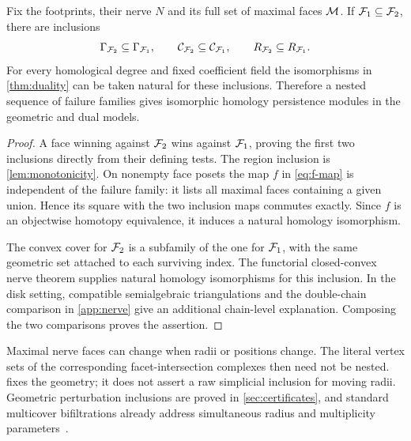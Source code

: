 \begin{theorem}\label{thm:natural}
Fix the footprints, their nerve $N$ and its full set of maximal faces $\mathcal M$. If $\mathcal F_1\subseteq\mathcal F_2$, there are inclusions
\[
\Gamma_{\mathcal F_2}\subseteq\Gamma_{\mathcal F_1},\qquad
\mathcal C_{\mathcal F_2}\subseteq\mathcal C_{\mathcal F_1},\qquad
R_{\mathcal F_2}\subseteq R_{\mathcal F_1}.
\]
For every homological degree and fixed coefficient field the isomorphisms in \cref{thm:duality} can be taken natural for these inclusions. Therefore a nested sequence of failure families gives isomorphic homology persistence modules in the geometric and dual models.
\end{theorem}
\begin{proof}
A face winning against $\mathcal F_2$ wins against $\mathcal F_1$, proving the first two inclusions directly from their defining tests. The region inclusion is \cref{lem:monotonicity}. On nonempty face posets the map $f$ in \cref{eq:f-map} is independent of the failure family: it lists all maximal faces containing a given union. Hence its square with the two inclusion maps commutes exactly. Since $f$ is an objectwise homotopy equivalence, it induces a natural homology isomorphism.

The convex cover for $\mathcal F_2$ is a subfamily of the one for $\mathcal F_1$, with the same geometric set attached to each surviving index. The functorial closed-convex nerve theorem supplies natural homology isomorphisms for this inclusion. In the disk setting, compatible semialgebraic triangulations and the double-chain comparison in \cref{app:nerve} give an additional chain-level explanation. Composing the two comparisons proves the assertion.
\end{proof}

\begin{remark}
Maximal nerve faces can change when radii or positions change. The literal vertex sets of the corresponding facet-intersection complexes then need not be nested.  fixes the geometry; it does not assert a raw simplicial inclusion for moving radii. Geometric perturbation inclusions are proved in \cref{sec:certificates}, and standard multicover bifiltrations already address simultaneous radius and multiplicity parameters~\cite{corbet,alonso}.
\end{remark}

